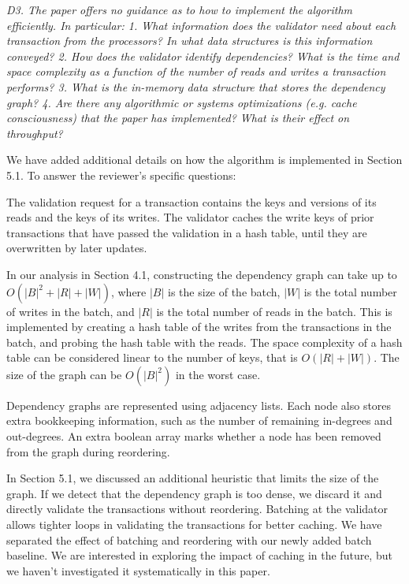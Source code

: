 \documentclass{article}
\begin{document}
\emph{D3. The paper offers no guidance as to how to implement the algorithm efficiently. In particular:
	1. What information does the validator need about each transaction from the processors? In what data structures is this information conveyed?
	2. How does the validator identify dependencies? What is the time and space complexity as a function of the number of reads and writes a transaction performs?
	3. What is the in-memory data structure that stores the dependency graph? 
	4. Are there any algorithmic or systems optimizations (e.g. cache consciousness) that the paper has implemented? What is their effect on throughput?}

We have added additional details on how the algorithm is implemented in Section 5.1. To answer the reviewer's specific questions:

The validation request for a transaction contains the keys and versions of its reads and the keys of its writes. The validator caches the write keys of prior transactions that have passed the validation in a hash table, until they are overwritten by later updates. 

In our analysis in Section 4.1, constructing the dependency graph can take up to $O(|B|^2+|R|+|W|)$, where $|B|$ is the size of the batch, $|W|$ is the total number of writes in the batch, and $|R|$ is the total number of reads in the batch. This is implemented by creating a hash table of the writes from the transactions in the batch, and probing the hash table with the reads. The space complexity of a hash table can be considered linear to the number of keys, that is $O(|R|+|W|)$. The size of the graph can be $O(|B|^2)$ in the worst case.

Dependency graphs are represented using adjacency lists. Each node also stores extra bookkeeping information, such as the number of remaining in-degrees and out-degrees. An extra boolean array marks whether a node has been removed from the graph during reordering.

In Section 5.1, we discussed an additional heuristic that limits the size of the graph. If we detect that the dependency graph is too dense, we discard it and directly validate the transactions without reordering. Batching at the validator allows tighter loops in validating the transactions for better caching. We have separated the effect of batching and reordering with our newly added batch baseline. We are interested in exploring the impact of caching in the future, but we haven't investigated it systematically in this paper.
\end{document}
